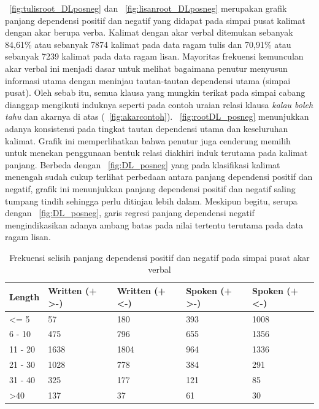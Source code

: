 \documentclass[10pt, a4paper, conference, compsocconf]{IEEEtran}
\begin{document}
\newpage
\pic~\ref{fig:tulisroot_DLposneg} dan \pic~\ref{fig:lisanroot_DLposneg} merupakan grafik panjang dependensi positif dan negatif yang didapat pada simpai pusat kalimat dengan akar berupa verba. Kalimat dengan akar verbal ditemukan sebanyak 84,61\% atau sebanyak 7874 kalimat pada data ragam tulis dan 70,91\% atau sebanyak 7239 kalimat pada data ragam lisan. Mayoritas frekuensi kemunculan akar verbal ini menjadi dasar untuk melihat bagaimana penutur menyusun informasi utama dengan meninjau tautan-tautan dependensi utama (simpai pusat). Oleh sebab itu, semua klausa yang mungkin terikat pada simpai cabang dianggap mengikuti induknya seperti pada contoh uraian relasi klausa \textit{kalau boleh tahu} dan akarnya di atas (\pic~\ref{fig:akarcontoh}). \pic~\ref{fig:rootDL_posneg} menunjukkan adanya konsistensi pada tingkat tautan dependensi utama dan keseluruhan kalimat. Grafik ini memperlihatkan bahwa penutur juga cenderung memilih untuk menekan penggunaan bentuk relasi diakhiri induk terutama pada kalimat panjang. Berbeda dengan \pic~\ref{fig:DL_posneg} yang pada klasifikasi kalimat menengah sudah cukup terlihat perbedaan antara panjang dependensi positif dan negatif, grafik ini menunjukkan panjang dependensi positif dan negatif saling tumpang tindih sehingga perlu ditinjau lebih dalam. Meskipun begitu, serupa dengan \pic~\ref{fig:DL_posneg}, garis regresi panjang dependensi negatif mengindikasikan adanya ambang batas pada nilai tertentu terutama pada data ragam lisan.

\begin{table}
\begin{center}
\caption{Frekuensi selisih panjang dependensi positif dan negatif pada simpai pusat akar verbal}  \label{tab:DLpusatposneg}
\begin{tabular}{p{1.1cm} p{1.2cm} p{1.2cm} p{1.3cm} p{1.3cm}}
\hline
Length & Written (+ \textgreater -) & Written (+ \textless -) & Spoken (+ \textgreater -) & Spoken (+ \textless -) \\ \hline
\textless= 5 	& 57	 	& 180 	& 393 & 1008 \\
6 - 10 		& 475 	& 796	& 655 & 1356 \\ 
11 - 20 		& 1638	& 1804	& 964 & 1336 \\
21 - 30 		& 1028	& 778	& 384 & 291 \\
31 - 40 		& 325	& 177	& 121 & 85 \\
\textgreater 40 	& 137	& 37	 	& 61 & 30 \\ \hline
   \end{tabular}
\end{center}
\end{table}
\end{document}
